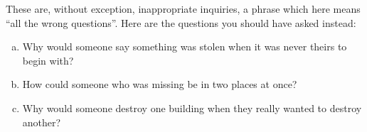 \documentclass[11pt]{article}
\begin{document}



\begin{solution}
These are, without exception, inappropriate inquiries, a phrase which here means “all the wrong questions”.  Here are the questions you should have asked instead:
\begin{enumerate}[(a)]
\item Why would someone say something was stolen when it was never theirs to begin with?
\item How could someone who was missing be in two places at once?
\item Why would someone destroy one building when they really wanted to destroy another?
\end{enumerate}
\end{solution}


\newtheorem{lemma}{Lemma}
\end{document}
